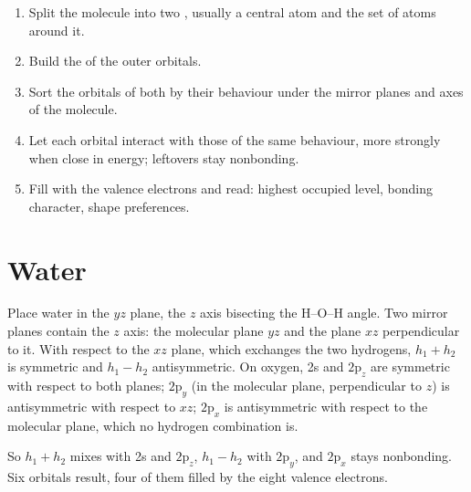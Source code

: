 \begin{method}\label{met:b2:fragment-orbitals:fragment-diagram}
\begin{enumerate}
  \item Split the molecule into two , usually a central atom and the set
        of atoms around it.
  \item Build the  of the outer orbitals.
  \item Sort the orbitals of both  by their behaviour under the mirror
        planes and axes of the molecule.
  \item Let each orbital interact with those of the same behaviour, more strongly
        when close in energy; leftovers stay nonbonding.
  \item Fill with the valence electrons and read: highest occupied level,
        bonding character, shape preferences.
\end{enumerate}
\end{method}

\section{Water}

Place water in the $yz$ plane, the $z$ axis bisecting the H--O--H angle. Two
mirror planes contain the $z$ axis: the molecular plane $yz$ and the plane $xz$
perpendicular to it. With respect to the $xz$ plane, which exchanges the two
hydrogens, $h_1 + h_2$ is symmetric and $h_1 - h_2$ antisymmetric. On oxygen, 2s and
$2\mathrm p_z$ are symmetric with respect to both planes; $2\mathrm p_y$ (in the
molecular plane, perpendicular to $z$) is antisymmetric with respect to $xz$;
$2\mathrm p_x$ is antisymmetric with respect to the molecular plane, which no
hydrogen combination is.

So $h_1 + h_2$ mixes with 2s and $2\mathrm p_z$, $h_1 - h_2$ with $2\mathrm p_y$, and
$2\mathrm p_x$ stays nonbonding. Six orbitals result, four of them filled by the eight
valence electrons.

